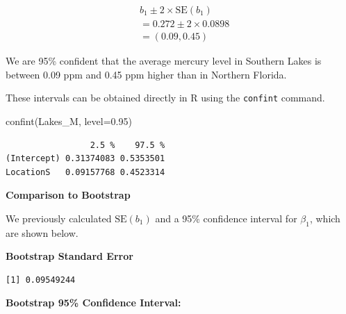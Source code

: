 \documentclass[
  letterpaper,
  DIV=11,
  numbers=noendperiod]{scrreprt}
\newenvironment{Shaded}{\begin{snugshade}}{\end{snugshade}}
\newcommand{\AttributeTok}[1]{\textcolor[rgb]{0.40,0.45,0.13}{#1}}
\newcommand{\DecValTok}[1]{\textcolor[rgb]{0.68,0.00,0.00}{#1}}
\newcommand{\FloatTok}[1]{\textcolor[rgb]{0.68,0.00,0.00}{#1}}
\newcommand{\FunctionTok}[1]{\textcolor[rgb]{0.28,0.35,0.67}{#1}}
\newcommand{\NormalTok}[1]{\textcolor[rgb]{0.00,0.23,0.31}{#1}}
\newcommand{\OtherTok}[1]{\textcolor[rgb]{0.00,0.23,0.31}{#1}}
\newcommand{\SpecialCharTok}[1]{\textcolor[rgb]{0.37,0.37,0.37}{#1}}
\begin{document}
\[
\begin{aligned}
& b_1 \pm 2\times\text{SE}(b_1) \\
& = 0.272 \pm 2\times{0.0898} \\
& = (0.09, 0.45)
\end{aligned}
\]

We are 95\% confident that the average mercury level in Southern Lakes
is between 0.09 ppm and 0.45 ppm higher than in Northern Florida.

These intervals can be obtained directly in R using the \texttt{confint}
command.

\begin{Shaded}
\begin{Highlighting}[]
\FunctionTok{confint}\NormalTok{(Lakes\_M, }\AttributeTok{level=}\FloatTok{0.95}\NormalTok{)}
\end{Highlighting}
\end{Shaded}

\begin{verbatim}
                 2.5 %    97.5 %
(Intercept) 0.31374083 0.5353501
LocationS   0.09157768 0.4523314
\end{verbatim}

\textbf{Comparison to Bootstrap}

We previously calculated \(\text{SE}(b_1)\) and a 95\% confidence
interval for \(\beta_1\), which are shown below.

\textbf{Bootstrap Standard Error}

\begin{Shaded}
\end{Shaded}

\begin{verbatim}
[1] 0.09549244
\end{verbatim}

\textbf{Bootstrap 95\% Confidence Interval:}

\begin{Shaded}
\end{Shaded}
\end{document}
